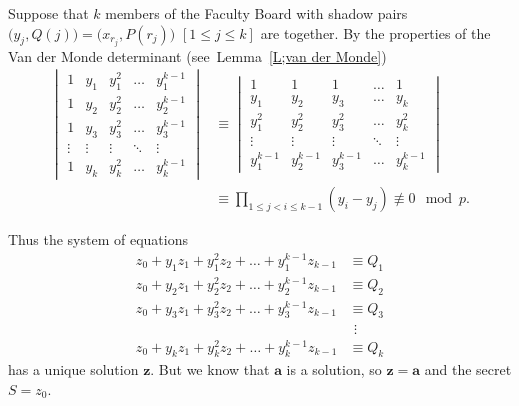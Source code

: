 \documentclass[12pt,a4paper]{article}
\theoremstyle{plain}
\theoremstyle{definition}
\begin{document}
Suppose that $k$ members of the Faculty Board
with shadow pairs
$\big(y_{j},Q(j)\big)=\big(x_{r_{j}},P(r_{j})\big)$ 
$[1\leq j\leq k]$ are together.
By the properties of the Van der Monde determinant
(see~Lemma~\ref{L;van der Monde})   
\begin{align*}
\begin{vmatrix}
1&y_{1}&y_{1}^{2}&\hdots&y_{1}^{k-1}\\
1&y_{2}&y_{2}^{2}&\hdots&y_{2}^{k-1}\\
1&y_{3}&y_{3}^{2}&\hdots&y_{3}^{k-1}\\
\vdots&\vdots&\vdots&\ddots&\vdots\\
1&y_{k}&y_{k}^{2}&\hdots&y_{k}^{k-1}
\end{vmatrix}
&\equiv
\begin{vmatrix}
1&1&1&\hdots&1\\
y_{1}&y_{2}&y_{3}&\hdots&y_{k}\\
y_{1}^{2}&y_{2}^{2}&y_{3}^{2}&\hdots&y_{k}^{2}\\
\vdots&\vdots&\vdots&\ddots&\vdots\\
y_{1}^{k-1}&y_{2}^{k-1}&y_{3}^{k-1}&\hdots&y_{k}^{k-1}
\end{vmatrix}\\
&\equiv\prod_{1\leq j<i\leq k-1}(y_{i}-y_{j})\not\equiv 0\mod{p}.
\end{align*}

Thus the system of equations
\begin{align*}
z_{0}+y_{1}z_{1}+y_{1}^{2}z_{2}+\hdots+y_{1}^{k-1}z_{k-1}
&\equiv Q_{1}\\
z_{0}+y_{2}z_{1}+y_{2}^{2}z_{2}+\hdots+y_{2}^{k-1}z_{k-1}
&\equiv Q_{2}\\
z_{0}+y_{3}z_{1}+y_{3}^{2}z_{2}+\hdots+y_{3}^{k-1}z_{k-1}
&\equiv Q_{3}\\
&\ \,\vdots\\
z_{0}+y_{k}z_{1}+y_{k}^{2}z_{2}+\hdots+y_{k}^{k-1}z_{k-1}&\equiv Q_{k}
\end{align*}
has a unique solution ${\mathbf z}$. But we know that
${\mathbf a}$ is a solution, so ${\mathbf z}={\mathbf a}$
and the secret $S=z_{0}$.
\end{document}
